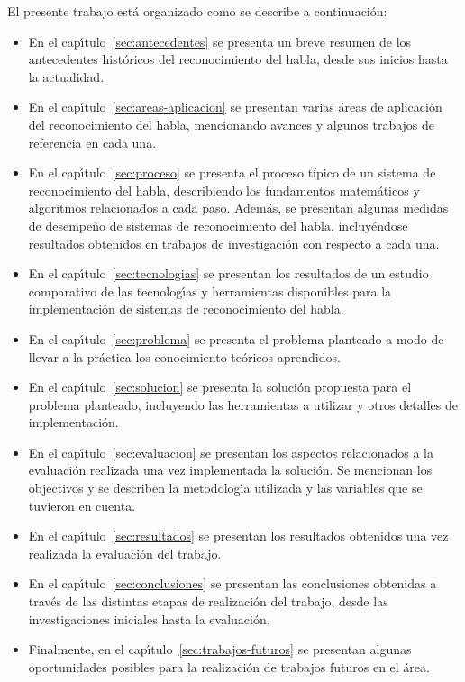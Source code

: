 El presente trabajo est\'a organizado como se describe a continuaci\'on:

\begin{itemize}
    \item En el cap{\'\i}tulo~\ref{sec:antecedentes} se presenta un breve resumen de los antecedentes hist\'oricos del reconocimiento
	del habla, desde sus inicios hasta la actualidad.
    \item En el cap{\'\i}tulo~\ref{sec:areas-aplicacion} se presentan varias \'areas de aplicaci\'on del reconocimiento del habla, 
	mencionando avances y algunos trabajos de referencia en cada una.
    \item En el cap{\'\i}tulo~\ref{sec:proceso} se presenta el proceso t\'{i}pico de un sistema de reconocimiento del habla,
	describiendo los fundamentos matem\'aticos y algoritmos relacionados a cada paso. Adem\'as, se presentan algunas 
    medidas de desempe\~no de sistemas de reconocimiento del
	habla, incluy\'endose resultados obtenidos en trabajos de investigaci\'on con respecto a cada una.
    \item En el cap{\'\i}tulo~\ref{sec:tecnologias} se presentan los resultados de un estudio comparativo de las tecnolog{\'\i}as
	y herramientas disponibles para la implementaci\'on de sistemas de reconocimiento del habla.
    \item En el cap{\'\i}tulo~\ref{sec:problema} se presenta el problema planteado a modo de llevar a la pr\'actica los
	conocimiento te\'oricos aprendidos.
    \item En el cap{\'\i}tulo~\ref{sec:solucion} se presenta la soluci\'on propuesta para el problema planteado, incluyendo
	las herramientas a utilizar y otros detalles de implementaci\'on.
    \item En el cap{\'\i}tulo~\ref{sec:evaluacion} se presentan los aspectos relacionados a la evaluaci\'on realizada una vez
	implementada la soluci\'on. Se mencionan los objectivos y se describen la metodolog{\'\i}a utilizada
	y las variables que se tuvieron en cuenta.
    \item En el cap{\'\i}tulo~\ref{sec:resultados} se presentan los resultados obtenidos una vez realizada la evaluaci\'on
	del trabajo.
    \item En el cap{\'\i}tulo~\ref{sec:conclusiones} se presentan las conclusiones obtenidas a trav\'es de las distintas
	etapas de realizaci\'on del trabajo, desde las investigaciones iniciales hasta la evaluaci\'on.
    \item Finalmente, en el cap{\'\i}tulo~\ref{sec:trabajos-futuros} se presentan algunas oportunidades posibles para
	la realizaci\'on de trabajos futuros en el \'area.
\end{itemize}